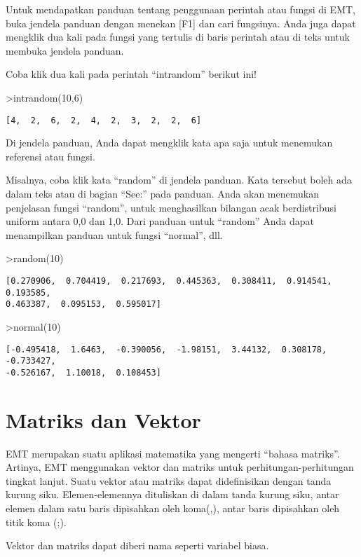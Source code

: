 \documentclass[
]{book}
\begin{document}
Untuk mendapatkan panduan tentang penggunaan perintah atau fungsi di EMT, buka jendela panduan dengan menekan {[}F1{]} dan cari fungsinya. Anda juga dapat mengklik dua kali pada fungsi yang tertulis di baris perintah atau di teks untuk membuka jendela panduan.

Coba klik dua kali pada perintah ``intrandom'' berikut ini!

\textgreater intrandom(10,6)

\begin{verbatim}
[4,  2,  6,  2,  4,  2,  3,  2,  2,  6]
\end{verbatim}

Di jendela panduan, Anda dapat mengklik kata apa saja untuk menemukan referensi atau fungsi.

Misalnya, coba klik kata ``random'' di jendela panduan. Kata tersebut boleh ada dalam teks atau di bagian ``See:'' pada panduan. Anda akan menemukan penjelasan fungsi ``random'', untuk menghasilkan bilangan acak berdistribusi uniform antara 0,0 dan 1,0. Dari panduan untuk ``random'' Anda dapat menampilkan panduan untuk fungsi ``normal'', dll.

\textgreater random(10)

\begin{verbatim}
[0.270906,  0.704419,  0.217693,  0.445363,  0.308411,  0.914541,  0.193585,
0.463387,  0.095153,  0.595017]
\end{verbatim}

\textgreater normal(10)

\begin{verbatim}
[-0.495418,  1.6463,  -0.390056,  -1.98151,  3.44132,  0.308178,  -0.733427,
-0.526167,  1.10018,  0.108453]
\end{verbatim}

\chapter{Matriks dan Vektor}\label{matriks-dan-vektor}

EMT merupakan suatu aplikasi matematika yang mengerti ``bahasa matriks''. Artinya, EMT menggunakan vektor dan matriks untuk perhitungan-perhitungan tingkat lanjut. Suatu vektor atau matriks dapat didefinisikan dengan tanda kurung siku. Elemen-elemennya dituliskan di dalam tanda kurung siku, antar elemen dalam satu baris dipisahkan oleh koma(,), antar baris dipisahkan oleh titik koma (;).

Vektor dan matriks dapat diberi nama seperti variabel biasa.
\end{document}
